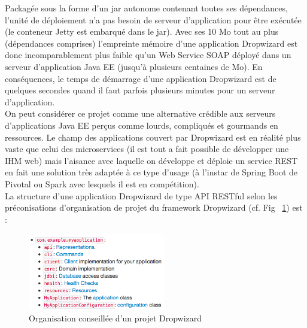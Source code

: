 \begin{itemize}
Packagée sous la forme d'un jar autonome contenant toutes ses dépendances, l'unité de déploiement n'a pas besoin de serveur d'application pour être exécutée (le conteneur Jetty est embarqué dans le jar). Avec ses 10 Mo tout au plus (dépendances comprises) l'empreinte mémoire d'une application Dropwizard est donc incomparablement plus faible qu'un Web Service SOAP déployé dans un serveur d'application Java EE (jusqu'à plusieurs centaines de Mo).
En conséquences, le temps de démarrage d'une application Dropwizard est de quelques secondes quand il faut parfois plusieurs minutes pour un serveur d'application.\\

On peut considérer ce projet comme une alternative crédible aux serveurs d'applications Java EE perçus comme lourds, compliqués et gourmands en ressources. Le champ des applications couvert par Dropwizard est en réalité plus vaste que celui des microservices (il est tout a fait possible de développer une IHM web) mais l'aisance avec laquelle on développe et déploie un service REST en fait une solution très adaptée à ce type d'usage (à l'instar de Spring Boot de Pivotal ou Spark avec lesquels il est en compétition).\\

La structure d'une application Dropwizard de type API RESTful selon les préconisations d'organisation de projet du framework Dropwizard  (cf. Fig ~\ref{Organisation_Dropwizard}) est : 
\\
\begin{figure}[h]
\centering
\includegraphics[width=6cm,heigth=6cm]{images/Dropwizard_Project.png}
\caption{\label{Organisation_Dropwizard}Organisation conseillée d'un projet Dropwizard}
\end{figure} 


\end{itemize}
